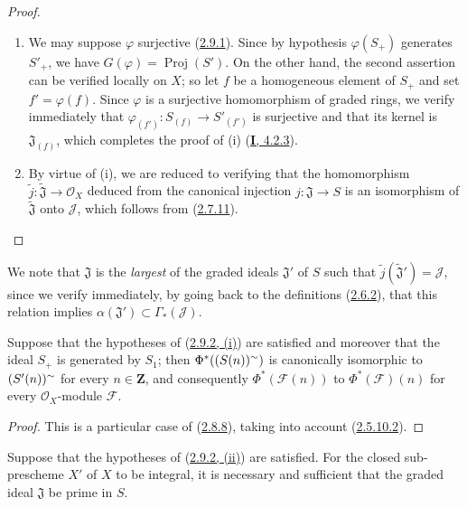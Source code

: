 \begin{proof}
\begin{enumerate}
  \item[\rm(i)] We may suppose $\varphi$ surjective
    (\hyperref[II.2.9.1]{2.9.1}). Since by hypothesis
    $\varphi(S_+)$ generates $S'_+$, we have
    $G(\varphi)=\operatorname{Proj}(S')$. On the other hand, the second
    assertion can be verified locally on $X$; so let $f$ be a homogeneous
    element of $S_+$ and set $f'=\varphi(f)$. Since $\varphi$ is a surjective
    homomorphism of graded rings, we verify immediately that
    $\varphi_{(f')}:S_{(f)}\to S'_{(f')}$ is surjective and that its kernel is
    $\mathfrak{J}_{(f)}$, which completes the proof of (i)
    (\hyperref[I.4.2.3]{\textbf{I}, 4.2.3}).
  \item[\rm(ii)] By virtue of (i), we are reduced to verifying that the
    homomorphism $\widetilde{j}:\widetilde{\mathfrak{J}}\to\mathcal{O}_X$
    deduced from the canonical injection $j:\mathfrak{J}\to S$ is an
    isomorphism of $\widetilde{\mathfrak{J}}$ onto $\mathcal{J}$, which
    follows from (\hyperref[II.2.7.11]{2.7.11}).
\end{enumerate}
\end{proof}

We note that $\mathfrak{J}$ is the \emph{largest} of the graded ideals
$\mathfrak{J}'$ of $S$ such that
$\widetilde{j}(\widetilde{\mathfrak{J}}')=\mathcal{J}$, since we verify
immediately, by going back to the definitions
(\hyperref[II.2.6.2]{2.6.2}), that this relation implies
$\alpha(\mathfrak{J}')\subset\Gamma_*(\mathcal{J})$.

\begin{corollary}[2.9.3]
\label{II.2.9.3}
Suppose that the hypotheses of
\textup{(\hyperref[II.2.9.2]{2.9.2, (i)})} are satisfied and moreover that the ideal
$S_+$ is generated by $S_1$; then $\Phi^*((S(n))^{\sim})$ is canonically
isomorphic to $(S'(n))^{\sim}$ for every $n\in\mathbf{Z}$, and consequently
$\Phi^*(\mathcal{F}(n))$ to $\Phi^*(\mathcal{F})(n)$ for every
$\mathcal{O}_X$-module $\mathcal{F}$.
\end{corollary}

\begin{proof}
This is a particular case of (\hyperref[II.2.8.8]{2.8.8}), taking into
account (\hyperref[II.2.5.10.2]{2.5.10.2}).
\end{proof}

\begin{corollary}[2.9.4]
\label{II.2.9.4}
Suppose that the hypotheses of
\textup{(\hyperref[II.2.9.2]{2.9.2, (ii)})} are satisfied. For the closed
sub-prescheme $X'$ of $X$ to be integral, it is necessary and sufficient that
the graded ideal $\mathfrak{J}$ be prime in $S$.
\end{corollary}

